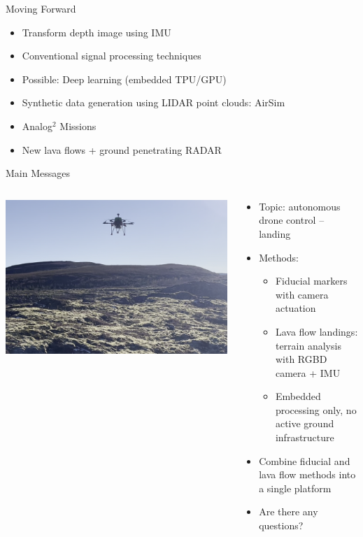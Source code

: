 \documentclass[aspectratio=169]{beamer}
\begin{document}

\begin{frame}{Moving Forward}
	\begin{itemize}
		\item Transform depth image using IMU
		\item Conventional signal processing techniques
		\item Possible: Deep learning (embedded TPU/GPU)
		\item Synthetic data generation using LIDAR point clouds: AirSim
		\item Analog$^2$ Missions
		\item New lava flows + ground penetrating RADAR
	\end{itemize}
\end{frame}

\begin{frame}{Main Messages}
\begin{columns}
	\begin{column}{0.4\textwidth}
		\includegraphics[width=\textwidth]{./images/depth_drone_flying}
	\end{column}
	\begin{column}{0.6\textwidth}
	\begin{itemize}
		\item Topic: autonomous drone control -- landing
		\item Methods:
		\begin{itemize}
			\item Fiducial markers with camera actuation
			\item Lava flow landings: terrain analysis with RGBD camera + IMU
			\item Embedded processing only, no active ground infrastructure
		\end{itemize}
	\item Combine fiducial and lava flow methods into a single platform
	\item Are there any questions?
	\end{itemize}
	\end{column}
\end{columns}
\end{frame}

%	
%	
\end{document}
